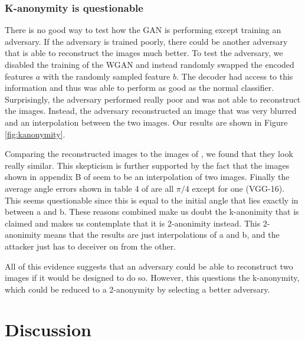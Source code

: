 \subsubsection{K-anonymity is questionable}
There is no good way to test how the GAN is performing except training an adversary. If the adversary is trained poorly, there could be another adversary that is able to reconstruct the images much better.
To test the adversary, we disabled the training of the WGAN and instead randomly swapped the encoded features $a$ with the randomly sampled feature $b$. The decoder had access to this information and thus was able to perform as good as the normal classifier. Surprisingly, the adversary performed really poor and was not able to reconstruct the images. Instead, the adversary reconstructed an image that was very blurred and an interpolation between the two images. Our results are shown in Figure \ref{fig:kanonymity}.

Comparing the reconstructed images to the images of \citet{xiang2020interpretable}, we found that they look really similar.
This skepticism is further supported by the fact that the images shown in appendix B of \citet{xiang2020interpretable} seem to be an interpolation of two images. Finally the average angle errors shown in table 4 of \citet{xiang2020interpretable} are all $\pi/4$ except for one (VGG-16). This seems questionable since this is equal to the initial angle that lies exactly in between a and b. These reasons combined make us doubt the k-anonimity that is claimed and makes us contemplate that it is 2-anonimity instead. This 2-anonimity means that the results are just interpolations of a and b, and the attacker just has to deceiver on from the other.

All of this evidence suggests that an adversary could be able to reconstruct two images if it would be designed to do so. However, this questions the k-anonymity, which could be reduced to a 2-anonymity by selecting a better adversary.



\section{Discussion}\label{Discussion}


